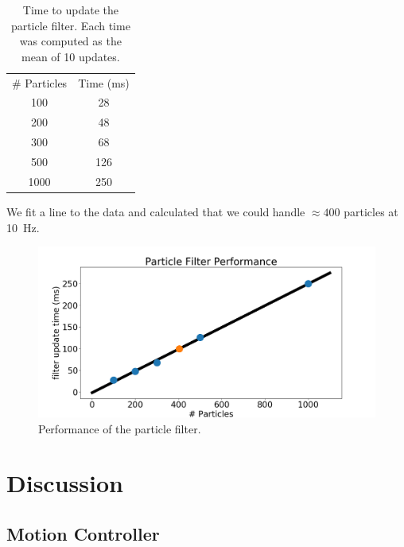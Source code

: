 \documentclass[journal]{IEEEtran}
\begin{document}
            \begin{table}[b]
                \centering
                \begin{tabular}{|c|c|} \hline
                     \# Particles & Time (ms) \\
                     100 & 28 \\ \hline
                     200 & 48 \\ \hline
                     300 & 68 \\ \hline
                     500 & 126 \\ \hline
                     1000 & 250 \\ \hline
                \end{tabular}
                \caption{Time to update the particle filter. Each time was computed as the mean of 10 updates.}
                \label{tab:filter_perf}
            \end{table}
            
            We fit a line to the data and calculated that we could handle $\approx400$ particles at \SI{10}{\hertz}.
        
            \begin{figure}[b]
                \centering
                \includegraphics[width=1\linewidth]{filter_perf.png}
                \caption{Performance of the particle filter.}
                \label{fig:perf}
            \end{figure}
            
\section{Discussion}
    
    \subsection{Motion Controller}
    
\end{document}
